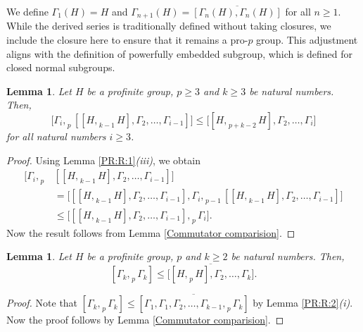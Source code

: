 \documentclass[12pt]{elsarticle}
\newtheorem{lemma}[theorem]{Lemma}
\newtheorem*{main corollary*}{Main Corollary}
\theoremstyle{definition}
\begin{document}
We define $\Gamma_1(H)=H$ and $\Gamma_{n+1}(H)=\overline{[\Gamma_n(H),\Gamma_n(H)]}$ for all $n\geq 1.$ While the derived series is traditionally defined without taking closures, we include the closure here to ensure that it remains a pro-$p$ group. This adjustment aligns with the definition of powerfully embedded subgroup, which is defined for closed normal subgroups.
\begin{lemma}\label{Lemma Derived series 1}
    Let $H$ be a profinite group, $p \geq 3$ and $k \geq 3$
    be natural numbers. Then, \[\bigr[\Gamma_i,_{\;p}[[H,_{\;k-1}H],\Gamma_2,\ldots, \Gamma_{i-1}]\bigl]\leqslant \bigr[[H,_{\;p+k-2}H],\Gamma_2,\ldots,\Gamma_i\bigr]\] for all natural numbers $i\geq 3$.
\end{lemma}
    \begin{proof} Using Lemma \ref{PR:R:1}\textit{(iii)}, we obtain
        \begin{align*}
            \bigr[\Gamma_i,_{\;p}&[[H,_{\;k-1}H],\Gamma_2,\dots ,\Gamma_{i-1}]\bigr]\\
            &=\bigl[[[H,_{\;k-1}H],\Gamma_2,\dots,\Gamma_{i-1}],\Gamma_i,_{\;p-1}[[H,_{\;k-1}H],\Gamma_2,\dots,\Gamma_{i-1}]\bigr]\\
            &\leqslant \bigl[[[H,_{\;k-1}H],\Gamma_2,\dots,\Gamma_{i-1}],_{\;p}\Gamma_i\bigr].
        \end{align*}Now the result follows from Lemma \ref{Commutator comparision}.
    \end{proof}
\begin{lemma}\label{Lemma Derived series 1A}
    Let $H$ be a profinite group, $p$ and $k\geq 2$ be natural numbers. Then, \[[\Gamma_k,_{\;p}\Gamma_k]\leqslant \overline{\bigl[[H,_{\;p}H],\Gamma_2,\dots,\Gamma_k]}.\]
\end{lemma}
\begin{proof}
    Note that $[\Gamma_k,_{\;p}\Gamma_k] \leqslant\overline{[\Gamma_1,\Gamma_1,\Gamma_2,\dots,\Gamma_{k-1},_{\;p}\Gamma_k]}$ by Lemma \ref{PR:R:2}\textit{(i)}. Now the proof follows by Lemma \ref{Commutator comparision}.
\end{proof}
\end{document}
